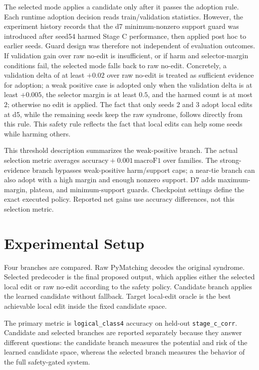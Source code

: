 \documentclass[aps,prd,12pt,twocolumn,superscriptaddress,floatfix,longbibliography]{revtex4-2}
\begin{document}
The selected mode applies a candidate only after it passes the adoption rule.
Each runtime adoption decision reads train/validation statistics. However,
the experiment history records that the d7 minimum-nonzero support guard was
introduced after seed54 harmed Stage C performance, then applied post hoc to
earlier seeds. Guard design was therefore not independent of evaluation
outcomes. If validation gain over raw no-edit is insufficient, or if
harm and selector-margin conditions fail, the selected mode falls back to raw
no-edit. Concretely, a validation delta of at least \(+0.02\) over raw no-edit
is treated as sufficient evidence for adoption; a weak positive case is adopted
only when the validation delta is at least \(+0.005\), the selector margin is at
least \(0.5\), and the harmed count is at most \(2\); otherwise no edit is
applied. The fact that only seeds 2 and 3 adopt local edits at d5, while the
remaining seeds keep the raw syndrome, follows directly from this rule. This
safety rule reflects the fact that local edits can help some seeds while harming
others.

This threshold description summarizes the weak-positive branch. The actual
selection metric averages \(\mathrm{accuracy}+0.001\,\mathrm{macroF1}\) over
families. The strong-evidence branch bypasses weak-positive harm/support caps;
a near-tie branch can also adopt with a high margin and enough nonzero support.
D7 adds maximum-margin, plateau, and minimum-support guards. Checkpoint
settings define the exact executed policy. Reported net gains use accuracy
differences, not this selection metric.

\section{Experimental Setup}

Four branches are compared. Raw PyMatching decodes the original syndrome.
Selected predecoder is the final proposed output, which applies either the
selected local edit or raw no-edit according to the safety policy. Candidate
branch applies the learned candidate without fallback. Target local-edit oracle
is the best achievable local edit inside the fixed candidate space.

The primary metric is \texttt{logical\_class4} accuracy on held-out
\texttt{stage\_c\_corr}. Candidate and selected branches are reported
separately because they answer different questions: the candidate branch
measures the potential and risk of the learned candidate space, whereas the
selected branch measures the behavior of the full safety-gated system.
\end{document}
